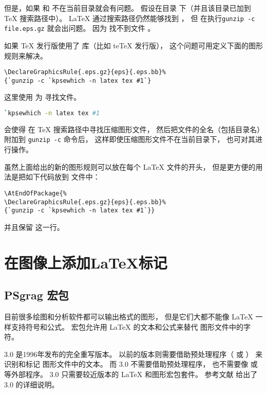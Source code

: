 但是，如果  和  不在当前目录就会有问题。
假设在目录  下（并且该目录已加到 \TeX{} 搜索路径中）。
\LaTeX{} 通过搜索路径仍然能够找到 ，
但  在执行\verb|gunzip -c file.eps.gz| 就会出问题。
因为  找不到文件 。

如果 \TeX{} 发行版使用了  库（比如 te\TeX{} 发行版），
这个问题可用定义下面的图形规则来解决。
\begin{lstlisting}
\DeclareGraphicsRule{.eps.gz}{eps}{.eps.bb}%
{`gunzip -c `kpsewhich -n latex tex #1`}
\end{lstlisting}
这里使用  为  寻找文件。
\begin{lstlisting}[language=bash]
`kpsewhich -n latex tex #1
\end{lstlisting}
会使得  在 \TeX{} 搜索路径中寻找压缩图形文件，
然后把文件的全名（包括目录名）附加到 \texttt{gunzip -c} 命令后，
这样即使压缩图形文件不在当前目录下， 也可对其进行操作。

虽然上面给出的新的图形规则可以放在每个 \LaTeX{} 文件的开头，
但是更方便的用法是把如下代码放到  文件中：
\begin{lstlisting}
\AtEndOfPackage{%
\DeclareGraphicsRule{.eps.gz}{eps}{.eps.bb}%
{`gunzip -c `kpsewhich -n latex tex #1`}}
\end{lstlisting}
并且保留  这一行。


\section{在图像上添加\LaTeX{}标记}\label{sec:graphics-text}

\subsection{PSgrag 宏包}\label{ssec:psfrag}

目前很多绘图和分析软件都可以输出格式的图形，
但是它们大都不能像 \LaTeX{} 一样支持符号和公式。
 宏包允许用 \LaTeX{} 的文本和公式来替代  图形文件中的字符。

 3.0 是1996年发布的完全重写版本。
以前的版本则需要借助预处理程序（ 或 ）
来识别和标记  图形文件中的文本。
而 3.0 不需要借助预处理程序，
也不需要像  或  等外部程序。
 3.0 只需要较近版本的 \LaTeX{} 和图形宏包套件。
参考文献 \cite{psfrag-doc} 给出了 3.0 的详细说明。

